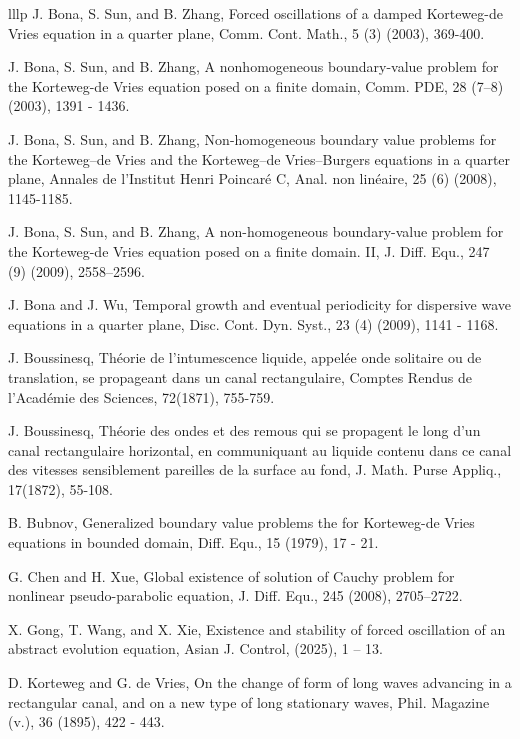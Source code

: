 \documentclass[10pt,a4paper,final]{article}
\numberwithin{equation}{section}
\begin{document}
\begin{thebibliography}{lllp}
 J. Bona, S. Sun, and B. Zhang, Forced oscillations of a damped Korteweg-de Vries equation in a quarter plane, Comm. Cont. Math., 5 (3) (2003), 369-400.

 J. Bona, S. Sun, and B. Zhang, A nonhomogeneous boundary-value problem for the Korteweg-de Vries equation posed on a finite domain, Comm. PDE, 28 (7--8) (2003), 1391 - 1436.

 J. Bona, S. Sun, and B. Zhang, Non-homogeneous boundary value problems for the Korteweg–de Vries and the Korteweg–de Vries–Burgers equations in a quarter plane, Annales de l'Institut Henri Poincaré C, Anal. non linéaire, 25 (6) (2008), 1145-1185.

 J. Bona, S. Sun, and B. Zhang,  A non-homogeneous boundary-value problem for the Korteweg-de Vries equation posed on a finite domain. II, J. Diff. Equ., 247 (9) (2009), 2558–2596.

 J. Bona and J. Wu, Temporal growth and eventual periodicity for dispersive wave equations in a quarter plane, Disc. Cont. Dyn. Syst., 23 (4) (2009), 1141 - 1168.  

 J. Boussinesq, 
Théorie de l'intumescence liquide, appelée onde solitaire ou de translation, se propageant dans un canal rectangulaire, Comptes Rendus de l'Académie des Sciences, 72(1871), 755-759.

 J. Boussinesq, Théorie des ondes et des remous qui se propagent le long d'un canal rectangulaire horizontal, en communiquant au liquide contenu dans ce canal des vitesses sensiblement pareilles de la surface au fond, J. Math. Purse Appliq., 17(1872), 55-108.  

 B. Bubnov, Generalized boundary value problems the for Korteweg-de Vries equations in bounded domain, Diff. Equ., 15 (1979), 17 - 21. 

 G. Chen and H. Xue, Global existence of solution of Cauchy problem for nonlinear pseudo-parabolic equation, J. Diff. Equ., 245 (2008),  2705–2722.

 X. Gong, T. Wang, and X. Xie, Existence and stability of forced oscillation of an abstract evolution equation, Asian J. Control, (2025), 1 – 13. 

 D. Korteweg and G. de Vries, On the change of form of long waves advancing in a rectangular canal,
 and on a new type of long stationary waves, Phil. Magazine (v.), 36 (1895), 422 - 443.


\end{thebibliography}
\end{document}
